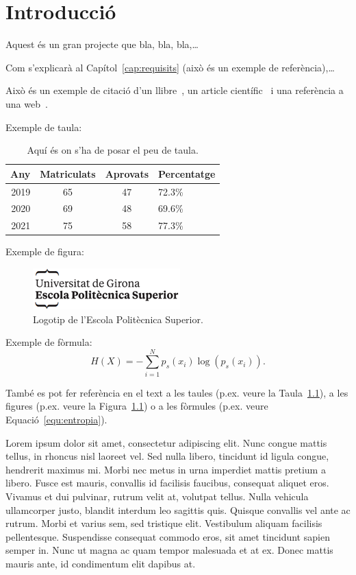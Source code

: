 \documentclass[a4paper,12pt,twoside]{ThesisStyle}
\begin{document}

\mainmatter

\chapter{Introducció}
\label{cap:intro}

Aquest és un gran projecte que bla, bla, bla,\ldots

Com s'explicarà al Capítol~\ref{cap:requisits} (això és un exemple de referència),\ldots

Això és un exemple de citació d'un llibre~\cite{Coleman1974}, un article científic~\cite{Ruiz2008} i una referència a una web~\cite{Halcon}.

Exemple de taula:
\begin{table}[htb]
\centering
\begin{tabular}{ | r | c | c | l | }
 \hline
  Any & Matriculats & Aprovats & Percentatge\\
\hline
 2019  & 65 & 47 & 72.3\%\\
 2020  & 69 & 48 & 69.6\%\\
 2021  & 75 & 58 & 77.3\%\\
  \hline
  \end{tabular}
\caption{\label{taula:taulaexemple} Aquí és on s'ha de posar el peu de taula. }
\end{table}

Exemple de figura:
\begin{figure}[htb]
\centering
\includegraphics[width=8 cm]{imatges/logo_eps.png}
\caption{\label{fig:logo} Logotip de l'Escola Politècnica Superior.}
\end{figure}

Exemple de fòrmula:
\begin{equation}
H(X) = -\sum_{i=1}^{N}p_s(x_i) \log \left( p_s(x_i) \right).
\label{equ:entropia}
\end{equation}


També es pot fer referència en el text a les taules (p.ex. veure la Taula~\ref{taula:taulaexemple}), a les figures (p.ex. veure la Figura~\ref{fig:logo}) o a les fòrmules (p.ex. veure Equació~\ref{equ:entropia}).

Lorem ipsum dolor sit amet, consectetur adipiscing elit. Nunc congue mattis tellus, in rhoncus nisl laoreet vel. Sed nulla libero, tincidunt id ligula congue, hendrerit maximus mi. Morbi nec metus in urna imperdiet mattis pretium a libero. Fusce est mauris, convallis id facilisis faucibus, consequat aliquet eros. Vivamus et dui pulvinar, rutrum velit at, volutpat tellus. Nulla vehicula ullamcorper justo, blandit interdum leo sagittis quis. Quisque convallis vel ante ac rutrum. Morbi et varius sem, sed tristique elit. Vestibulum aliquam facilisis pellentesque. Suspendisse consequat commodo eros, sit amet tincidunt sapien semper in. Nunc ut magna ac quam tempor malesuada et at ex. Donec mattis mauris ante, id condimentum elit dapibus at.
\end{document}
